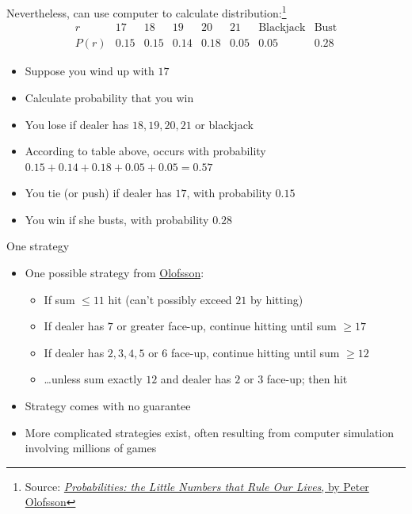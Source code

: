 \documentclass{beamer}
\theoremstyle{definition}
\begin{document}
\begin{frame}
Nevertheless, can use computer to calculate
distribution:\footnote{Source:
\href{http://www.wiley.com/WileyCDA/WileyTitle/productCd-0470624450.html}
{\color{blue}
{\em Probabilities: the Little Numbers that Rule Our Lives},
by Peter Olofsson}}
\[\begin{array}{r|lllllll}
r&17&18&19&20&21&\text{Blackjack}&\text{Bust}\\\hline
P\left(r\right)&0.15&0.15&0.14&0.18&0.05&0.05&0.28
\end{array}\]
\begin{example}
\begin{itemize}
\item Suppose you wind up with $17$
\item Calculate probability that you win
\item You lose if dealer has $18,19,20,21$ or blackjack
\item According to table above,
occurs with probability $0.15+0.14+0.18+0.05+0.05=0.57$
\item You tie (or \alert{push})
if dealer has $17$, with probability $0.15$
\item You win if she busts, with probability $0.28$
\end{itemize}
\end{example}
\end{frame}

\begin{frame}{One strategy}
\begin{itemize}
\item One possible strategy from
\href{http://www.wiley.com/WileyCDA/WileyTitle/productCd-0470624450.html}
{\color{blue}Olofsson}:
\begin{itemize}
\item If sum $\le 11$ hit (can't possibly exceed $21$ by hitting)
\item If dealer has $7$ or greater face-up, continue hitting until
sum $\ge 17$
\item If dealer has $2,3,4,5$ or $6$ face-up, continue hitting
until sum $\ge 12$
\item \dots unless sum exactly $12$ and dealer has $2$ or $3$
face-up; then hit
\end{itemize}
\item Strategy comes with no guarantee
\item More complicated strategies exist, often resulting
from computer simulation involving millions of games
\end{itemize}
\end{frame}
\end{document}
